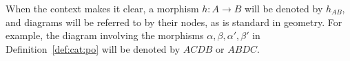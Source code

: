 \begin{notation}
    When the context makes it clear, a morphism \( h : A \mathop{\to} B \) will be denoted by \( h_{AB} \), and diagrams will be referred to by their nodes, as is standard in geometry. For example, the diagram involving the morphisms \( \alpha, \beta, \alpha', \beta' \) in Definition~\ref{def:cat:po} will be denoted by \( ACDB \) or \( ABDC \).
\end{notation}   